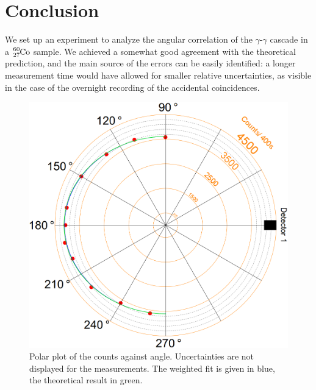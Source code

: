 \documentclass[twocolumn]{article}
\begin{document}
\section{Conclusion}
We set up an experiment to analyze the angular correlation of the $\gamma$-$\gamma$ cascade in a $\ce{_27^{60}Co}$ sample. We achieved a somewhat good agreement with the theoretical prediction, and the main source of the errors can be easily identified: a longer measurement time would have allowed for smaller relative uncertainties, as visible in the case of the overnight recording of the accidental coincidences.
\begin{figure}
	\centering
	\includegraphics[width=\linewidth]{polar2.png}
	\caption{Polar plot of the counts against angle. Uncertainties are not displayed for the measurements. The weighted fit is given in blue, the theoretical result in green.}
	\label{fig:polar}
\end{figure}
\end{document}

